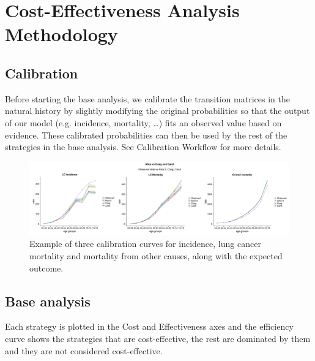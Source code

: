 
\chapter{Cost-Effectiveness Analysis Methodology} %

\label{sec:methodology} %

\section{Calibration}
Before starting the base analysis, we calibrate the transition matrices in the natural history by slightly modifying the original probabilities so that the output of our model (e.g. incidence, mortality, …) fits an observed value based on evidence. These calibrated probabilities can then be used by the rest of the strategies in the base analysis. See Calibration Workflow for more details.

\begin{figure}[h]
	\centering
	\includegraphics[width=\textwidth]{figures/lung_calibration_curves}
	\decoRule
	\caption[Calibration curve examples]{Example of three calibration curves for incidence, lung cancer mortality and mortality from other causes, along with the expected outcome.}
	\label{fig:lung_calibration_curves}
\end{figure}

\section{Base analysis}
Each strategy is plotted in the Cost and Effectiveness axes and the efficiency curve shows the strategies that are cost-effective, the rest are dominated by them and they are not considered cost-effective.

